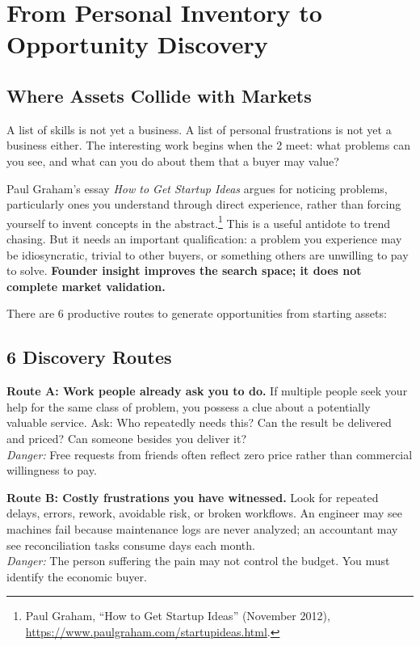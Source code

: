 \section{From Personal Inventory to Opportunity Discovery}

\subsection{Where Assets Collide with Markets}

A list of skills is not yet a business. A list of personal frustrations is not yet a business either. The interesting work begins when the 2 meet: what problems can you see, and what can you do about them that a buyer may value?

Paul Graham's essay \textit{How to Get Startup Ideas} argues for noticing problems, particularly ones you understand through direct experience, rather than forcing yourself to invent concepts in the abstract.\footnote{Paul Graham, ``How to Get Startup Ideas'' (November 2012), \url{https://www.paulgraham.com/startupideas.html}.} This is a useful antidote to trend chasing. But it needs an important qualification: a problem you experience may be idiosyncratic, trivial to other buyers, or something others are unwilling to pay to solve. \textbf{Founder insight improves the search space; it does not complete market validation.}

There are 6 productive routes to generate opportunities from starting assets:

\subsection{6 Discovery Routes}

\textbf{Route A: Work people already ask you to do.} If multiple people seek your help for the same class of problem, you possess a clue about a potentially valuable service. Ask: Who repeatedly needs this? Can the result be delivered and priced? Can someone besides you deliver it? \\
\textit{Danger:} Free requests from friends often reflect zero price rather than commercial willingness to pay.

\textbf{Route B: Costly frustrations you have witnessed.} Look for repeated delays, errors, rework, avoidable risk, or broken workflows. An engineer may see machines fail because maintenance logs are never analyzed; an accountant may see reconciliation tasks consume days each month. \\
\textit{Danger:} The person suffering the pain may not control the budget. You must identify the economic buyer.

